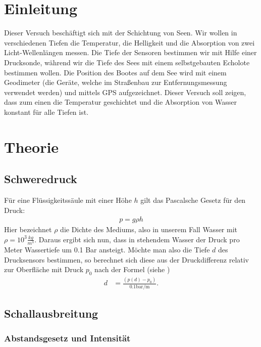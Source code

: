 \documentclass[12pt,a4paper,titlepage,headinclude,bibtotoc]{scrartcl}
\begin{document}
\section{Einleitung}
\label{sec:einleitung}
\cite{demtroeder}
Dieser Versuch beschäftigt sich mit der Schichtung von Seen.
Wir wollen in verschiedenen Tiefen die Temperatur, die Helligkeit und die Absorption von zwei Licht-Wellenlängen messen.
Die Tiefe der Sensoren bestimmen wir mit Hilfe einer Drucksonde, während wir die Tiefe des Sees mit einem selbstgebauten Echolote bestimmen wollen.
Die Position des Bootes auf dem See wird mit einem Geodimeter (die Geräte, welche im Straßenbau zur Entfernungsmessung verwendet werden) und mittels GPS aufgezeichnet.
Dieser Versuch soll zeigen, dass zum einen die Temperatur geschichtet und die Absorption von Wasser konstant für alle Tiefen ist.


\section{Theorie}
\label{sec:theorie}
\subsection{Schweredruck}

Für eine Flüssigkeitssäule mit einer Höhe $h$ gilt das Pascalsche Gesetz für den Druck:
\begin{align}
 p= g \rho h
\end{align}
Hier bezeichnet $\rho$ die Dichte des Mediums, also in unserem Fall Wasser mit $\rho = 10^3 \frac{kg}{m^3}$. Daraus ergibt sich nun, dass in stehendem Wasser der Druck pro Meter Wassertiefe um 0.1 Bar ansteigt.
Möchte man also die Tiefe $d$ des Drucksensors bestimmen, so berechnet sich diese aus der Druckdifferenz relativ zur Oberfläche mit Druck $p_0$ nach der Formel (siehe \cite[S.118]{gerthsen})
\begin{align}
	d&=\frac{(p(d)-p_0)}{0.1\si{\bar \per\metre}}. \label{eq:d}
\end{align}


\subsection{Schallausbreitung}

\subsubsection{Abstandsgesetz und Intensität}
\end{document}
